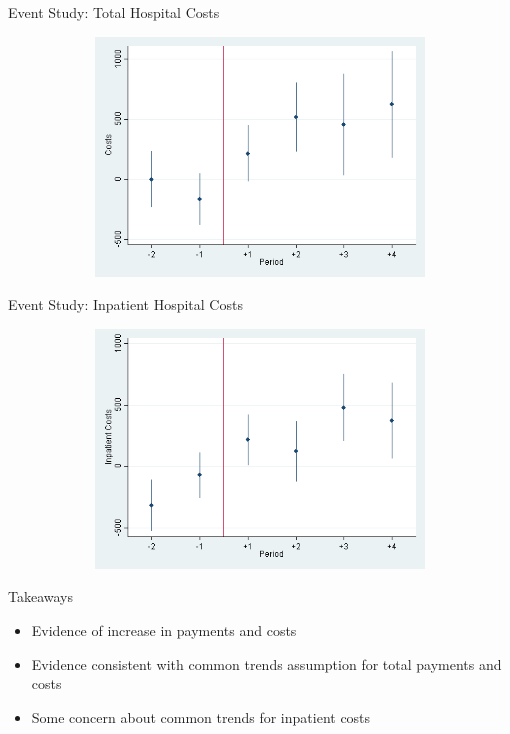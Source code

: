\documentclass[t]{beamer}
\begin{document}
\begin{frame}{Event Study: Total Hospital Costs}
    \begin{figure}
        \centering
        \includegraphics[height=2.5in,width=5in,keepaspectratio]{EventCharge_All_2011}
    \end{figure}
\end{frame}

\begin{frame}{Event Study: Inpatient Hospital Costs}
    \begin{figure}
        \centering
        \includegraphics[height=2.5in,width=5in,keepaspectratio]{EventCharge_IP_2011}
    \end{figure}
\end{frame}


\begin{frame}{Takeaways}
    \begin{itemize}
        \item Evidence of increase in payments and costs
        \item Evidence consistent with common trends assumption for total payments and costs
        \item Some concern about common trends for inpatient costs
    \end{itemize}
\end{frame}
\end{document}
